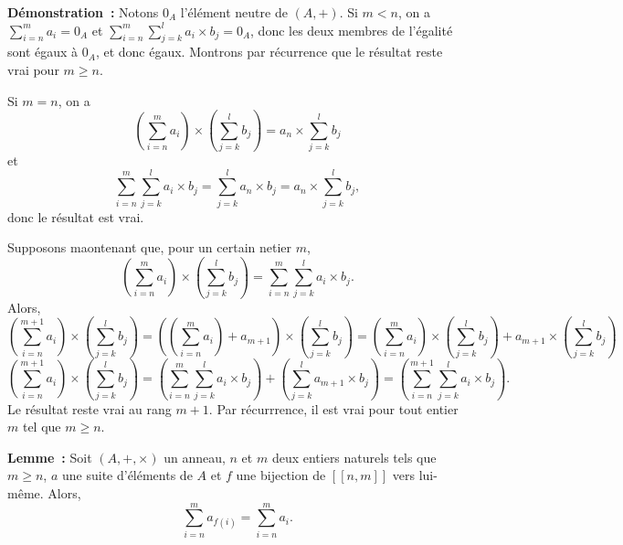 \noindent\textbf{Démonstration :} 
    Notons $0_A$ l'élément neutre de $(A, +)$.
    Si $m < n$, on a $\sum_{i=n}^m a_i = 0_A$ et $\sum_{i=n}^m \sum_{j=k}^l a_i \times b_j = 0_A$, donc les deux membres de l'égalité sont égaux à $0_A$, et donc égaux.
    Montrons par récurrence que le résultat reste vrai pour $m \geq n$. 

    Si $m = n$, on a
    \begin{equation*}
        \left( \sum_{i=n}^m a_i \right) \times \left( \sum_{j=k}^l b_j \right) = a_n \times \sum_{j=k}^l b_j
    \end{equation*}
    et
    \begin{equation*}
        \sum_{i=n}^m \sum_{j=k}^l a_i \times b_j = \sum_{j=k}^l a_n \times b_j = a_n \times \sum_{j=k}^l b_j,
    \end{equation*}
    donc le résultat est vrai.

    Supposons maontenant que, pour un certain netier $m$,
    \begin{equation*}
        \left( \sum_{i=n}^m a_i \right) \times \left( \sum_{j=k}^l b_j \right) = \sum_{i=n}^m \sum_{j=k}^l a_i \times b_j .
    \end{equation*}
    Alors, 
    \begin{equation*}
        \left( \sum_{i=n}^{m+1} a_i \right) \times \left( \sum_{j=k}^l b_j \right)
        = \left( \left( \sum_{i=n}^m a_i \right) + a_{m+1} \right) \times \left( \sum_{j=k}^l b_j \right)
        = \left( \sum_{i=n}^m a_i \right) \times \left( \sum_{j=k}^l b_j \right) + a_{m+1} \times \left( \sum_{j=k}^l b_j \right)
    \end{equation*}
    \begin{equation*}
        \left( \sum_{i=n}^{m+1} a_i \right) \times \left( \sum_{j=k}^l b_j \right)
        = \left( \sum_{i=n}^m \sum_{j=k}^l a_i \times b_j \right) + \left( \sum_{j=k}^l a_{m+1} \times b_j \right)
        = \left( \sum_{i=n}^{m+1} \sum_{j=k}^l a_i \times b_j \right) .
    \end{equation*}
    Le résultat reste vrai au rang $m+1$.
    Par récurrrence, il est vrai pour tout entier $m$ tel que $m \geq n$.

    \done

\medskip

\noindent\textbf{Lemme :} Soit $(A, +, \times)$ un anneau, $n$ et $m$ deux entiers naturels tels que $m \geq n$, $a$ une suite d'éléments de $A$ et $f$ une bijection de $[\![n, m]\!]$ vers lui-même. 
    Alors,
    \begin{equation*}
        \sum_{i=n}^m a_{f(i)} = \sum_{i=n}^m a_i.
    \end{equation*}

